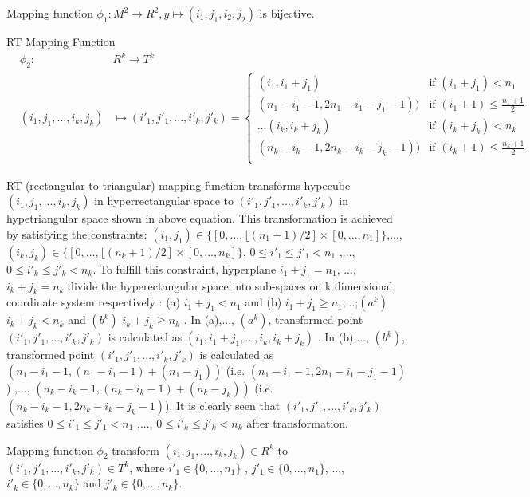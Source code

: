 \documentclass[AMA,LATO1COL]{WileyNJD-v2}
\begin{document}
\begin{lemma}\label{lemmaphi2}
Mapping function $\phi_1:   M^2 \rightarrow  R^2, y \mapsto (i_1,j_1,i_2,j_2)$ is bijective.
\end{lemma}

\begin{definition}
RT Mapping Function
\begin{eqnarray}
&\phi_2:&   R^k \rightarrow  T^k  \\
&(i_1,j_1,...,i_k,j_k)& \mapsto (i'_1,j'_1,...,i'_k,j'_k)=
  \begin{cases}
   (i_1,i_1+j_1) & \text{if } (i_1+j_1) < n_1 \\
   (n_1-i_1-1,2n_1-i_1-j_1-1))  & \text{if } (i_1+1) \leq \frac{n_1+1}{2} \\
   ...
   (i_k,i_k+j_k) & \text{if } (i_k+j_k) < n_k \\
   (n_k-i_k-1,2n_k-i_k-j_k-1))  & \text{if } (i_k+1) \leq \frac{n_k+1}{2} \\
  \end{cases}
\end{eqnarray}
\end{definition}
RT (rectangular to triangular) mapping function transforms hypecube $(i_1,j_1,...,i_k,j_k)$ in hyperrectangular space to $(i'_1,j'_1,...,i'_k,j'_k)$ in hypetriangular space shown in above equation. This transformation is achieved by satisfying the constraints: $(i_1,j_1)\in \{[0,...,\lfloor (n_1+1)/2] \times [0,...,n_1]\}$,...,$(i_k,j_k)\in \{[0,...,\lfloor (n_k+1)/2] \times [0,...,n_k]\}$,  $0\leq i'_1 \leq j'_1<n_1$ ,...,  $0\leq i'_k \leq j'_k<n_k$. To fulfill this constraint, hyperplane $i_1+j_1=n_1$, ..., $i_k+j_k=n_k$ divide the hyperectangular space into sub-spaces on k dimensional coordinate system respectively : (a) $i_1+j_1<n_1$ and (b) $i_1+j_1\geq n_1$;...;$(a^k)$ $i_k+j_k<n_k$ and $(b^k)$ $i_k+j_k\geq n_k$ . In (a),..., $(a^k)$, transformed point $(i'_1,j'_1,...,i'_k,j'_k)$ is calculated as $(i_1,i_1+j_1,...,i_k,i_k+j_k)$ . In (b),..., $(b^k)$, transformed point $(i'_1,j'_1,...,i'_k,j'_k)$ is calculated as $(n_1-i_1-1,(n_1-i_1-1)+(n_1-j_1))$ (i.e. $(n_1-i_1-1,2n_1-i_1-j_1-1)$) ,..., $(n_k-i_k-1,(n_k-i_k-1)+(n_k-j_k))$ (i.e. $(n_k-i_k-1,2n_k-i_k-j_k-1)$). It is clearly seen that $(i'_1,j'_1,...,i'_k,j'_k)$ satisfies $0\leq i'_1 \leq j'_1<n_1$ ,..., $0\leq i'_k \leq j'_k<n_k$ after transformation.

\begin{lemma}
Mapping function $\phi_2$ transform $(i_1,j_1,...,i_k,j_k) \in R^k$ to $(i'_1,j'_1,...,i'_k,j'_k)\in T^k $, where $i'_1 \in \{0,...,n_1\}$ , $j'_1 \in \{0,...,n_1\}$, ...,$i'_k \in \{0,...,n_k\}$ and $j'_k \in \{0,...,n_k\}$.
\end{lemma}
\end{document}
